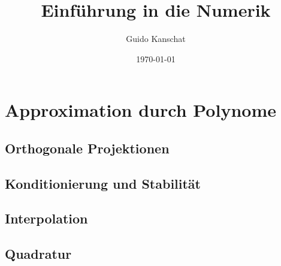 \usepackage[notref,notcite]{showkeys}
\usepackage{listings}
\lstset{language=Python}
\usepackage{tikz}
\usetikzlibrary{svg.path}


\def\constref#1{C_{\text{\ref{#1}}}}
\title{Einführung in die Numerik}
\author{Guido Kanschat}
\date{\today}

\def\vecx{\mathbf x}

\maketitle
\tableofcontents
\chapter{Approximation durch Polynome}
\section{Orthogonale Projektionen}


\section{Konditionierung und Stabilität}
%

\section{Interpolation}
%

\section{Quadratur}
%



\printindex

